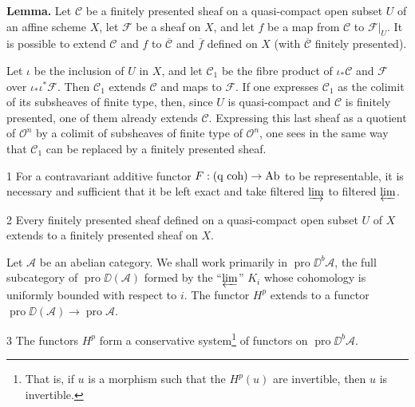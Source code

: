\par\medskip{}\label{appen:extension-lemma}\noindent\textbf{Lemma.}
Let $\mathcal C$ be a finitely presented sheaf on a quasi-compact open subset $U$ of an affine scheme $X$, let $\mathcal F$ be a sheaf on $X$, and let $f$ be a map from $\mathcal C$ to $\mathcal F|_U$. It is possible to extend $\mathcal C$ and $f$ to $\overline{\mathcal C}$ and $\overline f$ defined on $X$ (with $\overline{\mathcal C}$ finitely presented).
\par\medskip

Let $\iota$ be the inclusion of $U$ in $X$, and let $\mathcal C_1$ be the fibre product of $\iota_*\mathcal C$ and $\mathcal F$ over $\iota_*\iota^*\mathcal F$. Then $\mathcal C_1$ extends $\mathcal C$ and maps to $\mathcal F$. If one expresses $\mathcal C_1$ as the colimit of its subsheaves of finite type, then, since $U$ is quasi-compact and $\mathcal C$ is finitely presented, one of them already extends $\mathcal C$. Expressing this last sheaf as a quotient of $\mathcal O^n$ by a colimit of subsheaves of finite type of $\mathcal O^n$, one sees in the same way that $\mathcal C_1$ can be replaced by a finitely presented sheaf.

\begin{bookcorollary}{1}\label{appen:cor1}
For a contravariant additive functor $F:(\text{q coh})\to\operatorname{Ab}$ to be representable, it is necessary and sufficient that it be left exact and take filtered $\varinjlim$ to filtered $\varprojlim$.
\end{bookcorollary}

\begin{bookcorollary}{2}\label{appen:cor2}
Every finitely presented sheaf defined on a quasi-compact open subset $U$ of $X$ extends to a finitely presented sheaf on $X$.
\end{bookcorollary}

Let $\mathcal A$ be an abelian category. We shall work primarily in $\operatorname{pro}\DD^b\mathcal A$, the full subcategory of $\operatorname{pro}\DD(\mathcal A)$ formed by the ``$\varprojlim$'' $K_i$ whose cohomology is uniformly bounded with respect to $i$. The functor $H^p$ extends to a functor $\operatorname{pro}\DD(\mathcal A)\longrightarrow\operatorname{pro}\mathcal A$.

\begin{bookproposition}{3}\label{appen:prop3}
The functors $H^p$ form a conservative system\footnote{That is, if $u$ is a morphism such that the $H^p(u)$ are invertible, then $u$ is invertible.} of functors on $\operatorname{pro}\DD^b\mathcal A$.
\end{bookproposition}

